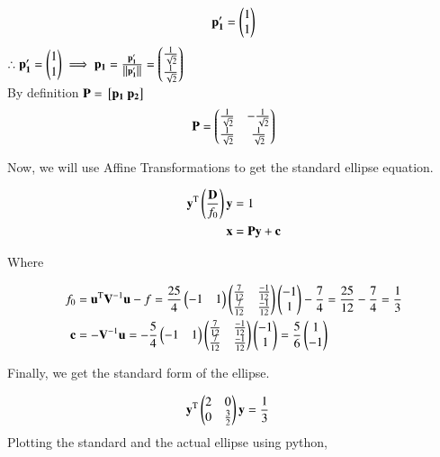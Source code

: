 \documentclass[journal]{IEEEtran}
\begin{document}
\begin{align}
	\mathbf{p_1^\prime} &=  \begin{pmatrix}1 \\ 1\end{pmatrix} \\
\end{align} 
$\therefore \mathbf{p_1^\prime}  = \begin{pmatrix}1 \\ 1\end{pmatrix} \implies \mathbf{p_1} = \frac{\mathbf{p_1^\prime} }{\left\lVert\mathbf{p_1^\prime}\right\rVert}  = \begin{pmatrix} \frac{1}{\sqrt{2}} \\ \frac{1}{\sqrt{2}}\end{pmatrix}$ \\
By definition $\mathbf{P} = {}\left[\mathbf{p_1} ~ \mathbf{p_2}\right]$ \\ 

\begin{align}
	\mathbf{P} = \begin{pmatrix} \frac{1}{\sqrt{2}} & -\frac{1}{\sqrt{2}} \\ \frac{1}{\sqrt{2}} & \frac{1}{\sqrt{2}} \end{pmatrix} \label{Rdef}
\end{align}

Now, we will use Affine Transformations to get the standard ellipse equation.

\begin{align}
	\mathbf{y}^\text{T}\left(\frac{\mathbf{D}}{f_0}\right)\mathbf{y} &= 1\\
	\mathbf{x} &= \mathbf{Py} + \mathbf{c} \label{t1}\\
\end{align}

Where 

\begin{align}
	f_0 &= \mathbf{u}^\text{T}\mathbf{V}^{-1}\mathbf{u} - f  = \frac{25}{4} \begin{pmatrix}-1 & 1\end{pmatrix} \begin{pmatrix}\frac{7}{12} & \frac{-1}{12} \\ \frac{7}{12} & \frac{-1}{12}\end{pmatrix}  \begin{pmatrix}-1 \\ 1\end{pmatrix}  - \frac{7}{4}= \frac{25}{12} -  \frac{7}{4} = \frac{1}{3}\\
	\mathbf{c} &= -\mathbf{V}^{-1}\mathbf{u} = -\frac{5}{4}  \begin{pmatrix}-1 & 1\end{pmatrix} \begin{pmatrix}\frac{7}{12} & \frac{-1}{12} \\ \frac{7}{12} & \frac{-1}{12}\end{pmatrix}\begin{pmatrix} -1 \\ 1\end{pmatrix} = \frac{5}{6}  \begin{pmatrix} 1 \\ -1\end{pmatrix}
\end{align}

Finally, we get the standard form of the ellipse.

\begin{align}
		\mathbf{y}^\text{T}\begin{pmatrix}2 & 0 \\ 0 & \frac{3}{2}\end{pmatrix}\mathbf{y} &= \frac{1}{3}
\end{align}
Plotting the standard and the actual ellipse using python,
\end{document}
